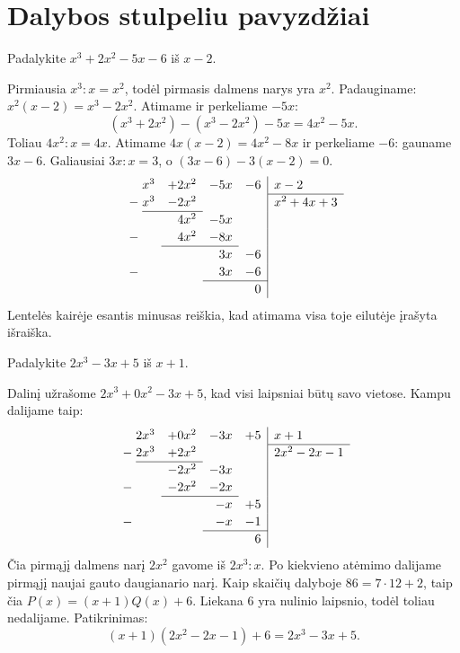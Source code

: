 \documentclass[11pt,a4paper]{scrartcl}
\begin{document}
\section{Dalybos stulpeliu pavyzdžiai}
\begin{example}
Padalykite \(x^3+2x^2-5x-6\) iš \(x-2\).
\end{example}
\begin{solution}
Pirmiausia \(x^3:x=x^2\), todėl pirmasis dalmens narys yra \(x^2\). Padauginame: \(x^2(x-2)=x^3-2x^2\). Atimame ir perkeliame \(-5x\):
\[(x^3+2x^2)-(x^3-2x^2)-5x=4x^2-5x.\]
Toliau \(4x^2:x=4x\). Atimame \(4x(x-2)=4x^2-8x\) ir perkeliame \(-6\): gauname \(3x-6\). Galiausiai \(3x:x=3\), o \((3x-6)-3(x-2)=0\).
\[
\renewcommand{\arraystretch}{1.15}
\begin{array}{r@{\;}rrrr|l}
 &x^3&+2x^2&-5x&-6&x-2\\\cline{6-6}
 -&x^3&-2x^2&&&x^2+4x+3\\\cline{2-3}
 &&4x^2&-5x&&\\
 -&&4x^2&-8x&&\\\cline{3-4}
 &&&3x&-6&\\
 -&&&3x&-6&\\\cline{4-5}
 &&&&0&
\end{array}
\]
Lentelės kairėje esantis minusas reiškia, kad atimama visa toje eilutėje įrašyta išraiška.
\end{solution}
\begin{example}
Padalykite \(2x^3-3x+5\) iš \(x+1\).
\end{example}
\begin{solution}
Dalinį užrašome \(2x^3+0x^2-3x+5\), kad visi laipsniai būtų savo vietose. Kampu dalijame taip:
\[
\renewcommand{\arraystretch}{1.15}
\begin{array}{r@{\;}rrrr|l}
 &2x^3&+0x^2&-3x&+5&x+1\\\cline{6-6}
 -&2x^3&+2x^2&&&2x^2-2x-1\\\cline{2-3}
 &&-2x^2&-3x&&\\
 -&&-2x^2&-2x&&\\\cline{3-4}
 &&&-x&+5&\\
 -&&&-x&-1&\\\cline{4-5}
 &&&&6&
\end{array}
\]
Čia pirmąjį dalmens narį \(2x^2\) gavome iš \(2x^3:x\). Po kiekvieno atėmimo dalijame pirmąjį naujai gauto daugianario narį. Kaip skaičių dalyboje \(86=7\cdot12+2\), taip čia \(P(x)=(x+1)Q(x)+6\).
Liekana \(6\) yra nulinio laipsnio, todėl toliau nedalijame. Patikrinimas:
\[(x+1)(2x^2-2x-1)+6=2x^3-3x+5.\]
\end{solution}
\end{document}
